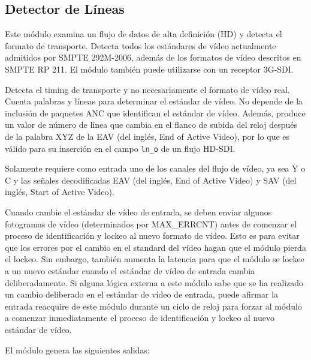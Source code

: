
\subsection{Detector de Líneas}

Este módulo examina un flujo de datos de alta definición (HD) y detecta el
formato de transporte. Detecta todos los estándares de vídeo actualmente
admitidos por SMPTE 292M-2006, además de los formatos de vídeo descritos en
SMPTE RP 211. El módulo también puede utilizarse con un receptor 3G-SDI\@.

Detecta el timing de transporte y no necesariamente el formato de vídeo real.
Cuenta palabras y líneas para determinar el estándar de vídeo. No depende de la
inclusión de paquetes ANC que identifican el estándar de vídeo. Además, produce
un valor de número de línea que cambia en el flanco de subida del reloj después
de la palabra XYZ de la EAV  (del inglés, End of Active Video), por lo que es válido para su inserción en el campo
\texttt{ln\_o} de un flujo HD-SDI\@.

Solamente requiere como entrada uno de los canales del flujo de vídeo, ya sea Y
o C y las señales decodificadas EAV  (del inglés, End of Active Video) y SAV (del inglés, Start of Active Video)\@.

Cuando cambie el estándar de vídeo de entrada, se deben enviar algunos fotogramas
de vídeo (determinados por MAX\_ERRCNT) antes de comenzar el proceso de
identificación y lockeo al nuevo formato de vídeo. Esto es para evitar que los
errores por el cambio en el standard del vídeo hagan que el módulo pierda el
lockeo. Sin embargo, también aumenta la latencia para que el módulo se lockee a
un nuevo estándar cuando el estándar de vídeo de entrada cambia deliberadamente.
Si alguna lógica externa a este módulo sabe que se ha realizado un cambio deliberado
en el estándar de vídeo de entrada, puede afirmar la entrada reacquire de este
módulo durante un ciclo de reloj para forzar al módulo a comenzar inmediatamente
el proceso de identificación y lockeo al nuevo estándar de vídeo.

El módulo genera las siguientes salidas:


